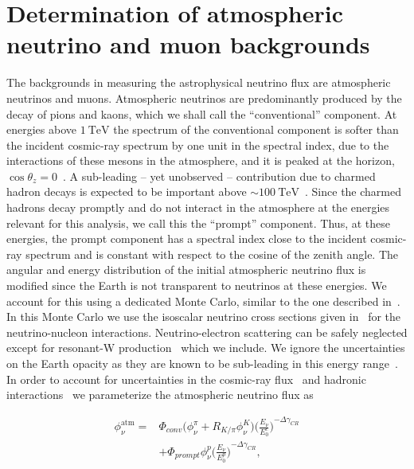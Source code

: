 \section{Determination of atmospheric neutrino and muon backgrounds\label{sec:backgrounds}}

The backgrounds in measuring the astrophysical neutrino flux are atmospheric neutrinos and muons.
Atmospheric neutrinos are predominantly produced by the decay of pions and kaons, which we shall call the ``conventional'' component.
At energies above $\SI{1}\TeV$ the spectrum of the conventional component is softer than the incident cosmic-ray spectrum by one unit in the spectral index, due to the interactions of these mesons in the atmosphere, and it is peaked at the horizon, $\cos\theta_z=0$~\cite{Gaisser:2002jj,Barr:2004br,Honda:2006qj,Petrova:2012qf}.
A sub-leading -- yet unobserved -- contribution due to charmed hadron decays is expected to be important above $\sim\SI{100}\TeV$~\cite{Bhattacharya:2015jpa}.
Since the charmed hadrons decay promptly and do not interact in the atmosphere at the energies relevant for this analysis, we call this the ``prompt'' component.
Thus, at these energies, the prompt component has a spectral index close to the incident cosmic-ray spectrum and is constant with respect to the cosine of the zenith angle.
The angular and energy distribution of the initial atmospheric neutrino flux is modified since the Earth is not transparent to neutrinos at these energies.
We account for this using a dedicated Monte Carlo, similar to the one described in~\cite{Gazizov:2004va}.
In this Monte Carlo we use the isoscalar neutrino cross sections given in~\cite{CooperSarkar:2011pa} for the neutrino-nucleon interactions.
Neutrino-electron scattering can be safely neglected except for resonant-W production~\cite{Glashow:1960zz} which we include.
We ignore the uncertainties on the Earth opacity as they are known to be sub-leading in this energy range~\cite{Gandhi:1995tf,CooperSarkar:2011pa,Vincent:2017svp}.
In order to account for uncertainties in the cosmic-ray flux~\cite{Dembinski:2017zsh} and hadronic interactions~\cite{Fedynitch:2012fs} we parameterize the atmospheric neutrino flux as
\noindent
\begin{linenomath*}
	\begin{equation}
	\begin{split}
	\phi_\nu^{\textrm{atm}} =& \Phi_{conv} \bigg(\phi^\pi_\nu + R_{K/\pi} \phi^K_\nu\bigg) {\bigg(\frac{E_\nu}{E_0^c} \bigg)}^{-\Delta \gamma_{CR}} \\ &+ \Phi_{prompt} \phi^p_\nu {\bigg(\frac{E_\nu}{E_0^p} \bigg)}^{-\Delta \gamma_{CR}},
	\end{split}
	\label{eq:atm_flux_equation}
	\end{equation}
\end{linenomath*}
